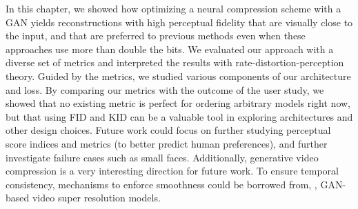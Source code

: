 In this chapter, we showed how optimizing a neural compression scheme with a GAN yields reconstructions with high perceptual fidelity that are visually close to the input, and that are preferred to previous methods even when these approaches use more than double the bits.
We evaluated our approach with a diverse set of metrics and interpreted the results with rate-distortion-perception theory.
Guided by the metrics, we studied various components of our architecture and loss. 
By comparing our metrics with the outcome of the user study, we showed that no existing metric is perfect for ordering arbitrary models right now, but that using FID and KID can be a valuable tool in exploring architectures and other design choices. 
Future work could focus on further studying perceptual score indices and metrics (to better predict human preferences), and further investigate failure cases such as small faces.
Additionally, generative video compression is a very interesting direction for future work. To ensure temporal consistency, mechanisms to enforce smoothness could be borrowed from, \eg, GAN-based video super resolution models.


\FloatBarrier
\newpage

